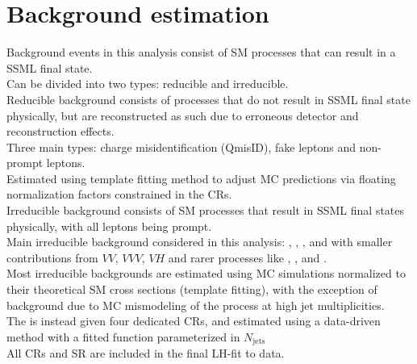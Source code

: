 \documentclass[../thesis.tex]{subfiles}
\begin{document}
\section{Background estimation}
\label{sec:bg}
Background events in this analysis consist of SM processes that can result in a \tttt SSML final state.\\
Can be divided into two types: reducible and irreducible.\\
Reducible background consists of processes that do not result in SSML final state physically, but are reconstructed as such due to erroneous detector and reconstruction effects.\\
Three main types: charge misidentification (QmisID), fake leptons and non-prompt leptons.\\
Estimated using template fitting method to adjust MC predictions via floating normalization factors constrained in the CRs.\\
Irreducible background consists of SM processes that result in SSML final states physically, with all leptons being prompt.\\
Main irreducible background considered in this analysis: \tttt, \ttW, \ttZ, and \ttH with smaller contributions from $VV$, $VVV$, $VH$ and rarer processes like \ttVV, \tWZ, \tZq and \ttt.\\
Most irreducible backgrounds are estimated using MC simulations normalized to their theoretical SM cross sections (template fitting), with the exception of \ttW background due to MC mismodeling of the process at high jet multiplicities.\\
The \ttW is instead given four dedicated CRs, and estimated using a data-driven method with a fitted function parameterized in $N_\mathrm{jets}$\\
All CRs and SR are included in the final LH-fit to data.


\end{document}
